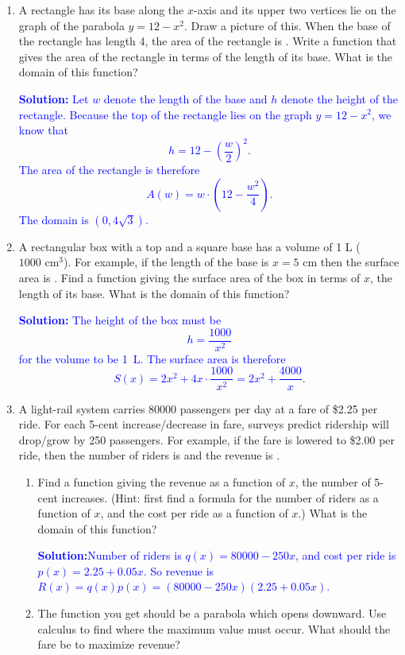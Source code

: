 \documentclass[letterpaper,11pt]{article}
\newcommand{\sol}[2]{\begin{minipage}[c][#1]{\linewidth}{\textcolor{blue}{\textbf{Solution:}}\quad \textcolor{blue}{#2}}\end{minipage}}
\newcommand{\ans}[1]{\underbar{\qquad \textcolor{red}{#1} \qquad}}
\newcommand{\sol}[2]{\begin{minipage}[c][#1]{\linewidth}{\vfill}\end{minipage}}
\newcommand{\ans}[1]{\underbar{\qquad \textcolor{white}{#1} \qquad}}
\begin{document}
\begin{enumerate}
\item A rectangle has its base along the $x$-axis and its upper two vertices lie on the graph of the parabola $y=12-x^2$.  Draw a picture of this.  When the base of the rectangle has length 4, the area of the rectangle is \ans{32}.  Write a function that gives the area of the rectangle in terms of the length of its base.  What is the domain of this function?

\sol{3in}{
	Let $w$ denote the length of the base and $h$ denote the height of the rectangle.
	Because the top of the rectangle lies on the graph $y=12-x^2$, we know that
	\[h = 12-\left( \frac{w}{2} \right)^2.\]
	The area of the rectangle is therefore
	\[A(w) = w\cdot \left( 12 - \frac{w^2}{4} \right).\]
	The domain is $(0,4\sqrt{3})$.
}

\newpage
\item  A rectangular box with a top and a square base has a volume of 1 L ($1000 \text{ cm}^3$).  For example, if the length of the base is $x=5$ cm then the surface area is \ans{$850 \text{cm}^2$}. Find a function giving the surface area of the box in terms of $x$, the length of its base.  What is the domain of this function?

\sol{2.5in}{
The height of the box must be
\[h = \frac{1000}{x^2}\]
for the volume to be 1~L.
The surface area is therefore
\[S(x)=2x^2 + 4x\cdot\frac{1000}{x^2} = 2x^2 + \frac{4000}{x}.\]
}

\item  A light-rail system carries 80000 passengers per day at a fare of \$2.25 per ride.  For each 5-cent increase/decrease in fare, surveys predict ridership will drop/grow by 250 passengers.  For example, if the fare is lowered to \$2.00 per ride, then the number of riders is \ans{$81250$} and the revenue is \ans{$\$162500$}.
\begin{enumerate}
\item Find a function giving the revenue as a function of $x$, the number of 5-cent increases. (Hint: first find a formula for the number of riders as a function of $x$, and the cost per ride as a function of $x$.)  What is the domain of this function?

\sol{1.5 in}{Number of riders is $q(x)=80000-250x$, and cost per ride is $p(x)=2.25+0.05x$.  So revenue is 
$R(x)=q(x)p(x)=(80000-250x)(2.25+0.05x)$.}

\item  The function you get should be a parabola which opens downward.  Use calculus to find where the maximum value must occur.  What should the fare be to maximize revenue?


\end{enumerate}
\end{enumerate}
\end{document}
